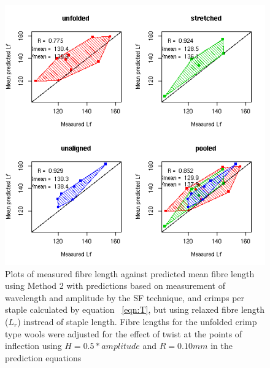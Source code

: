 %

\begin{figure}[!h]
  \centering
  \includegraphics[width=1.1\textwidth]{figsfpredlflrt.png}
  \caption{Plots of measured fibre length  against predicted mean fibre length using Method 2 with predictions based on measurement of wavelength and amplitude by the SF technique, and crimps per staple calculated by equation ~\ref{eqn:T}, but using relaxed fibre length ($L_{r}$) instread of staple length. Fibre lengths for the unfolded crimp type wools were adjusted for the effect of twist at the points of inflection using $H = 0.5 * amplitude$ and $R = 0.10 mm$ in the prediction equations }
  \label{fig:sfpredlflrt}
\end{figure}

%


